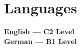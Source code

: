 \documentclass[a4,11pt]{article}
\begin{document}
%

\section{Languages}
 \begin{itemize}[leftmargin=0.15in, label={}]
    \small{\item{
          \textbf{English --- C2 Level } \vspace*{4pt} \\
          \textbf{German --- B1 Level } \vspace*{4pt} \\ 
    }}
 \end{itemize}

\end{document}
